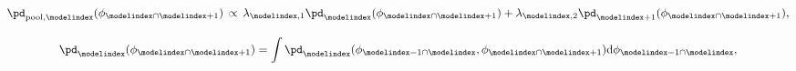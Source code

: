 \begin{gather}
  \pd_{\text{pool}, \modelindex}(\phi_{\modelindex \cap \modelindex + 1}) \, \propto \,
  \lambda_{\modelindex, 1}\pd_{\modelindex}(\phi_{\modelindex \cap \modelindex + 1}) +
  \lambda_{\modelindex, 2}\pd_{\modelindex + 1}(\phi_{\modelindex \cap \modelindex + 1}),
  \label{eqn:M-model-linear-pooling-one} \\[1em]
  \pd_{\modelindex}(\phi_{\modelindex \cap \modelindex + 1}) = 
    \int 
    \pd_{\modelindex}(\phi_{\modelindex - 1 \cap \modelindex}, \phi_{\modelindex \cap \modelindex + 1})
    \text{d}\phi_{\modelindex - 1 \cap \modelindex},
  \label{eqn:M-model-linear-pooling-two}
\end{gather}